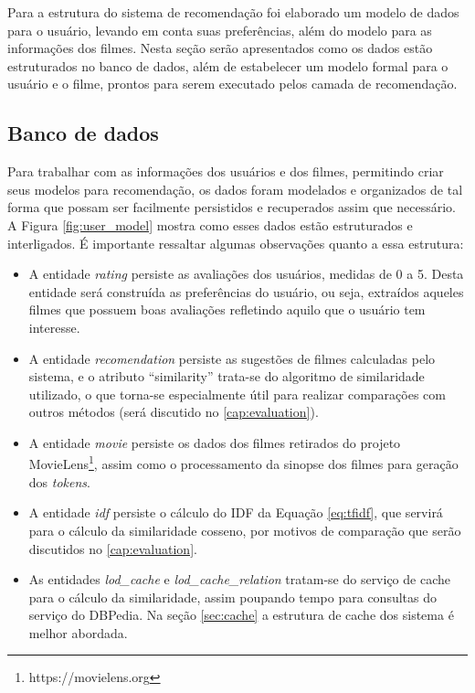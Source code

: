 Para a estrutura do sistema de recomendação foi elaborado um modelo de dados para o usuário, levando em conta suas preferências, além do modelo para as informações dos filmes. Nesta seção serão apresentados como os dados estão estruturados no banco de dados, além de estabelecer um modelo formal para o usuário e o filme, prontos para serem executado pelos camada de recomendação.

\subsection{Banco de dados}

Para trabalhar com as informações dos usuários e dos filmes, permitindo criar seus modelos para recomendação, os dados foram modelados e organizados de tal forma que possam ser facilmente persistidos e recuperados assim que necessário. A Figura \ref{fig:user_model} mostra como esses dados estão estruturados e interligados. É importante ressaltar algumas observações quanto a essa estrutura:

\begin{itemize}
	\item{A entidade \textit{rating} persiste as avaliações dos usuários, medidas de 0 a 5. Desta entidade será construída as preferências do usuário, ou seja, extraídos aqueles filmes que possuem boas avaliações refletindo aquilo que o usuário tem interesse.}

	\item{A entidade \textit{recomendation} persiste as sugestões de filmes calculadas pelo sistema, e o atributo \enquote{similarity} trata-se do algoritmo de similaridade utilizado, o que torna-se especialmente útil para realizar comparações com outros métodos (será discutido no \ref{cap:evaluation}).}

	\item{A entidade \textit{movie} persiste os dados dos filmes retirados do projeto MovieLens\footnote{https://movielens.org}, assim como o processamento da sinopse dos filmes para geração dos \textit{tokens}.}

	\item{A entidade \textit{idf} persiste o cálculo do \ac{IDF} da Equação \ref{eq:tfidf}, que servirá para o cálculo da similaridade cosseno, por motivos de comparação que serão discutidos no \ref{cap:evaluation}.}

	\item{As entidades \textit{lod\_cache} e \textit{lod\_cache\_relation} tratam-se do serviço de cache para o cálculo da similaridade, assim poupando tempo para consultas do serviço do DBPedia. Na seção \ref{sec:cache} a estrutura de cache dos sistema é melhor abordada.}
\end{itemize}

